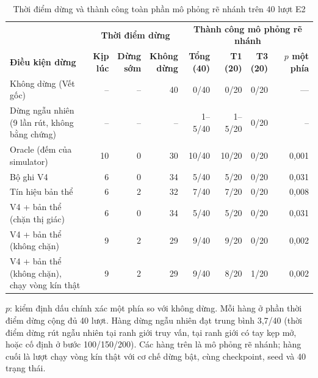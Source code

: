 \begin{table}[htbp]
\centering\small
\caption{Thời điểm dừng và thành công toàn phần mô phỏng rẽ nhánh trên 40 lượt E2}
\label{tab:halt-combined}
\label{tab:halt-timing-combined}
\label{tab:halt-forks-combined}
\setlength{\tabcolsep}{2.5pt}
\begin{tabular}{l|r|r|r|r|r|r|r}
\toprule
& \multicolumn{3}{c|}{\textbf{Thời điểm dừng}} & \multicolumn{4}{c}{\textbf{Thành công mô phỏng rẽ nhánh}} \\
\cmidrule(lr){2-4}\cmidrule(lr){5-8}
\textbf{Điều kiện dừng} & \shortstack{\textbf{Kịp}\\\textbf{lúc}} & \shortstack{\textbf{Dừng}\\\textbf{sớm}} & \shortstack{\textbf{Không}\\\textbf{dừng}} & \shortstack{\textbf{Tổng}\\\textbf{(40)}} & \shortstack{\textbf{T1}\\\textbf{(20)}} & \shortstack{\textbf{T3}\\\textbf{(20)}} & \shortstack{\textbf{$p$ một}\\\textbf{phía}} \\
\midrule
Không dừng (Vết gốc) & -- & -- & 40 & 0/40 & 0/20 & 0/20 & --- \\
\shortstack[l]{Dừng ngẫu nhiên\\(9 lần rút, không bằng chứng)} & -- & -- & -- & 1--5/40 & 1--5/20 & 0/20 & -- \\
Oracle (đếm của simulator) & 10 & 0 & 30 & 10/40 & 10/20 & 0/20 & 0,001 \\
Bộ ghi V4 & 6 & 0 & 34 & 5/40 & 5/20 & 0/20 & 0,031 \\
Tín hiệu bản thể & 6 & 2 & 32 & 7/40 & 7/20 & 0/20 & 0,008 \\
V4 + bản thể (chặn thị giác) & 6 & 0 & 34 & 5/40 & 5/20 & 0/20 & 0,031 \\
V4 + bản thể (không chặn) & 9 & 2 & 29 & 9/40 & 9/20 & 0/20 & 0,002 \\
\midrule
\shortstack[l]{V4 + bản thể (không chặn),\\chạy vòng kín thật} & 9 & 2 & 29 & 9/40 & 8/20 & 1/20 & 0,002 \\
\bottomrule
\end{tabular}
\par\smallskip
{\footnotesize $p$: kiểm định dấu chính xác một phía so với không dừng. Mỗi hàng ở phần thời điểm dừng cộng đủ 40 lượt. Hàng dừng ngẫu nhiên đạt trung bình 3,7/40 (thời điểm dừng rút ngẫu nhiên tại ranh giới truy vấn, tại ranh giới có tay kẹp mở, hoặc cố định ở bước 100/150/200). Các hàng trên là mô phỏng rẽ nhánh; hàng cuối là lượt chạy vòng kín thật với cơ chế dừng bật, cùng checkpoint, seed và 40 trạng thái.\par}
\end{table}

